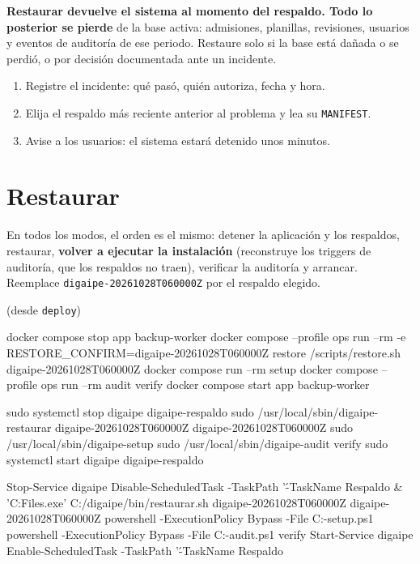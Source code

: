 \textbf{Restaurar devuelve el sistema al momento del respaldo. Todo lo posterior se pierde} de
la base activa: admisiones, planillas, revisiones, usuarios y eventos de auditoría de ese
periodo. Restaure solo si la base está dañada o se perdió, o por decisión documentada ante un
incidente.

\begin{enumerate}
	\item Registre el incidente: qué pasó, quién autoriza, fecha y hora.
	\item Elija el respaldo más reciente anterior al problema y lea su \texttt{MANIFEST}.
	\item Avise a los usuarios: el sistema estará detenido unos minutos.
\end{enumerate}

\section{Restaurar}

En todos los modos, el orden es el mismo: detener la aplicación y los respaldos, restaurar,
\textbf{volver a ejecutar la instalación} (reconstruye los triggers de auditoría, que los
respaldos no traen), verificar la auditoría y arrancar. Reemplace
\texttt{digaipe-20261028T060000Z} por el respaldo elegido.

 (desde \texttt{deploy})
\begin{codigo}
docker compose stop app backup-worker
docker compose --profile ops run --rm -e RESTORE_CONFIRM=digaipe-20261028T060000Z restore /scripts/restore.sh digaipe-20261028T060000Z
docker compose run --rm setup
docker compose --profile ops run --rm audit verify
docker compose start app backup-worker
\end{codigo}

\begin{codigo}
sudo systemctl stop digaipe digaipe-respaldo
sudo /usr/local/sbin/digaipe-restaurar digaipe-20261028T060000Z digaipe-20261028T060000Z
sudo /usr/local/sbin/digaipe-setup
sudo /usr/local/sbin/digaipe-audit verify
sudo systemctl start digaipe digaipe-respaldo
\end{codigo}

\begin{codigo}
Stop-Service digaipe
Disable-ScheduledTask -TaskPath '\DIGAIPE\' -TaskName Respaldo
& 'C:\Program Files\Git\bin\bash.exe' C:/digaipe/bin/restaurar.sh digaipe-20261028T060000Z digaipe-20261028T060000Z
powershell -ExecutionPolicy Bypass -File C:\digaipe\bin\digaipe-setup.ps1
powershell -ExecutionPolicy Bypass -File C:\digaipe\bin\digaipe-audit.ps1 verify
Start-Service digaipe
Enable-ScheduledTask -TaskPath '\DIGAIPE\' -TaskName Respaldo
\end{codigo}

